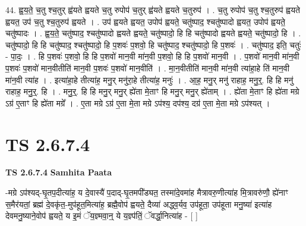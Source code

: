 \documentclass[17pt]{extarticle}
\begin{document}
44. ह्व॒य॒ते॒ च॒तु श्च॒तुर् ह्व॑यते ह्वयते च॒तु रुपोप॑ च॒तुर् ह्व॑यते ह्वयते च॒तुरुप॑ । . च॒तु रुपोप॑ च॒तु श्च॒तुरुप॑ ह्वयते ह्वयत॒ उप॑ च॒तु श्च॒तुरुप॑ ह्वयते । . उप॑ ह्वयते ह्वयत॒ उपोप॑ ह्वयते॒ चतु॑ष्पाद॒ श्चतु॑ष्पादो ह्वयत॒ उपोप॑ ह्वयते॒ चतु॑ष्पादः । . ह्व॒य॒ते॒ चतु॑ष्पाद॒ श्चतु॑ष्पादो ह्वयते ह्वयते॒ चतु॑ष्पादो॒ हि हि चतु॑ष्पादो ह्वयते ह्वयते॒ चतु॑ष्पादो॒ हि । . चतु॑ष्पादो॒ हि हि चतु॑ष्पाद॒ श्चतु॑ष्पादो॒ हि प॒शवः॑ प॒शवो॒ हि चतु॑ष्पाद॒ श्चतु॑ष्पादो॒ हि प॒शवः॑ । . चतु॑ष्पाद॒ इति॒ चतुः॑ - पा॒दः॒ । . हि प॒शवः॑ प॒शवो॒ हि हि प॒शवो॑ मान॒वी मा॑न॒वी प॒शवो॒ हि हि प॒शवो॑ मान॒वी । . प॒शवो॑ मान॒वी मा॑न॒वी प॒शवः॑ प॒शवो॑ मान॒वीतीति॑ मान॒वी प॒शवः॑ प॒शवो॑ मान॒वीति॑ । . मा॒न॒वीतीति॑ मान॒वी मा॑न॒वी त्या॑हा॒हे ति॑ मान॒वी मा॑न॒वी त्या॑ह । . इत्या॑हा॒हे तीत्या॑ह॒ मनु॒र् मनु॑रा॒हे तीत्या॑ह॒ मनुः॑ । . आ॒ह॒ मनु॒र् मनु॑ राहाह॒ मनु॒र्॒. हि हि मनु॑ राहाह॒ मनु॒र्॒. हि । . मनु॒र्॒. हि हि मनु॒र् मनु॒र् ह्ये॑ता मे॒ताꣳ हि मनु॒र् मनु॒र् ह्ये॑ताम् । . ह्ये॑ता मे॒ताꣳ हि ह्ये॑ता मग्रे ऽग्र॑ ए॒ताꣳ हि ह्ये॑ता मग्रे᳚ । . ए॒ता मग्रे ऽग्र॑ ए॒ता मे॒ता मग्रे ऽप॑श्य॒ दप॑श्य॒ दग्र॑ ए॒ता मे॒ता मग्रे ऽप॑श्यत् । \newline
\pagebreak
{}
\section*{ TS 2.6.7.4 }

\textbf{TS 2.6.7.4 } \newline
\textbf{Samhita Paata} \newline

-मग्रे ऽप॑श्यद्-घृ॒तप॒दीत्या॑ह॒ य दे॒वास्यै॑ प॒दाद्-घृ॒तमपी᳚ड्यत॒ तस्मा॑दे॒वमा॑ह मैत्रावरु॒णीत्या॑ह मि॒त्रावरु॑णौ॒ ह्ये॑नाꣳ स॒मैर॑यतां॒ ब्रह्म॑ दे॒वकृ॑त॒-मुप॑हूत॒मित्या॑ह॒ ब्रह्मै॒वोप॑ ह्वयते॒ दैव्या॑ अद्ध्व॒र्यव॒ उप॑हूता॒ उप॑हूता मनु॒ष्या॑ इत्या॑ह देवमनु॒ष्याने॒वोप॑ ह्वयते॒ य इ॒मं ॅय॒ज्ञ्मवा॒न्॒ ये य॒ज्ञ्प॑तिं॒ ॅवर्द्धा॒नित्या॑ह - [  ] \newline
\end{document}
